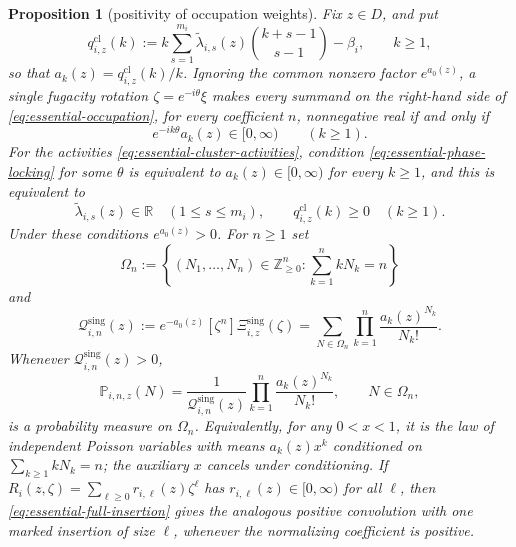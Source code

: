 \documentclass[reqno]{article}
\newtheorem{prop}[theorem]{Proposition}
\theoremstyle{definition}
\theoremstyle{remark}
\theoremstyle{plain}
\begin{document}
\begin{prop}[positivity of occupation weights]\label{prop:essential-cluster-potts}
Fix $z\in D$, and put
\[
q^{\mathrm{cl}}_{i,z}(k):=
 k\sum_{s=1}^{m_i}\widetilde\lambda_{i,s}(z)\binom{k+s-1}{s-1}-\beta_i,
\qquad k\ge1,
\]
so that $a_k(z)=q^{\mathrm{cl}}_{i,z}(k)/k$. Ignoring the common nonzero factor $e^{a_0(z)}$, a single fugacity rotation $\zeta=e^{-i\theta}\xi$ makes every summand on the right-hand side of \eqref{eq:essential-occupation}, for every coefficient $n$, nonnegative real if and only if
\begin{equation}\label{eq:essential-phase-locking}
e^{-ik\theta}a_k(z)\in[0,\infty)\qquad(k\ge1).
\end{equation}
For the activities \eqref{eq:essential-cluster-activities}, condition \eqref{eq:essential-phase-locking} for some $\theta$ is equivalent to $a_k(z)\in[0,\infty)$ for every $k\ge1$, and this is equivalent to
\[
\widetilde\lambda_{i,s}(z)\in\mathbb R\quad(1\le s\le m_i),
\qquad
q^{\mathrm{cl}}_{i,z}(k)\ge0\quad(k\ge1).
\]
Under these conditions $e^{a_0(z)}>0$. For $n\ge1$ set
\[
\Omega_n:=\left\{(N_1,\ldots,N_n)\in\mathbb Z_{\ge0}^n:
\sum_{k=1}^n kN_k=n\right\}
\]
and
\[
\mathcal Q^{\mathrm{sing}}_{i,n}(z):=e^{-a_0(z)}[\zeta^n]\Xi^{\mathrm{sing}}_{i,z}(\zeta)
=\sum_{N\in\Omega_n}\prod_{k=1}^n\frac{a_k(z)^{N_k}}{N_k!}.
\]
Whenever $\mathcal Q^{\mathrm{sing}}_{i,n}(z)>0$,
\[
\mathbb P_{i,n,z}(N)=
\frac{1}{\mathcal Q^{\mathrm{sing}}_{i,n}(z)}
\prod_{k=1}^n\frac{a_k(z)^{N_k}}{N_k!},
\qquad N\in\Omega_n,
\]
is a probability measure on $\Omega_n$. Equivalently, for any $0<x<1$, it is the law of independent Poisson variables with means $a_k(z)x^k$ conditioned on $\sum_{k\ge1}kN_k=n$; the auxiliary $x$ cancels under conditioning. If $R_i(z,\zeta)=\sum_{\ell\ge0}r_{i,\ell}(z)\zeta^\ell$ has $r_{i,\ell}(z)\in[0,\infty)$ for all $\ell$, then \eqref{eq:essential-full-insertion} gives the analogous positive convolution with one marked insertion of size $\ell$, whenever the normalizing coefficient is positive.
\end{prop}
\end{document}
